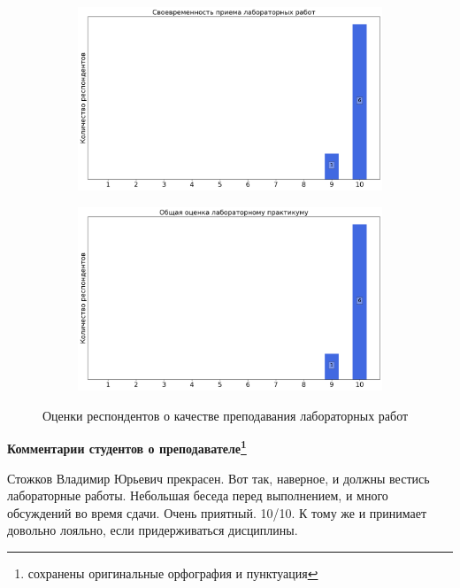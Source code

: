 \begin{figure}[H]
\begin{subfigure}[b]{0.45\textwidth}
                    \centering
                    \includegraphics[width=\textwidth]{images/3 course/Общая физика - квантовая физика/labniks-marks-Стожков В.Ю.-2.png}
                \end{subfigure}
                \begin{subfigure}[b]{0.45\textwidth}
                    \centering
                    \includegraphics[width=\textwidth]{images/3 course/Общая физика - квантовая физика/labniks-marks-Стожков В.Ю.-3.png}
                \end{subfigure}	
                \caption{Оценки респондентов о качестве преподавания лабораторных работ}
            \end{figure}

            \textbf{Комментарии студентов о преподавателе\protect\footnote{сохранены оригинальные орфография и пунктуация}}
                \begin{commentbox} 
                    Стожков Владимир Юрьевич прекрасен. Вот так, наверное, и должны вестись лабораторные работы. Небольшая беседа перед выполнением, и много обсуждений во время сдачи. Очень приятный. 10/10. К тому же и принимает довольно лояльно, если придерживаться дисциплины. 
                \end{commentbox}


